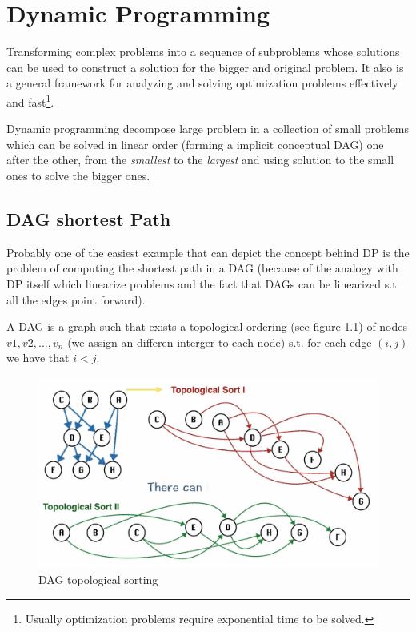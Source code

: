 \chapter{Dynamic Programming}
Transforming complex problems into a sequence of subproblems whose solutions can be used to construct a solution for the bigger and original problem.
It also is a general framework for analyzing and solving optimization problems effectively and fast\footnote{Usually optimization problems require exponential time to be solved.}.

Dynamic programming decompose large problem in a collection of small problems which can be solved in linear order (forming a implicit conceptual DAG) one after the other, from the \textit{smallest} to the \textit{largest} and using solution to the small ones to solve the bigger ones. 

\section{DAG shortest Path}
Probably one of the easiest example that can depict the concept behind DP is the problem of computing the shortest path in a DAG (because of the analogy with DP itself which linearize problems and the fact that DAGs can be linearized s.t. all the edges point forward).

\begin{framed}
A DAG is a graph such that exists a topological ordering (see figure \ref{fig:DAGsort}) of nodes $v1,v2, \ldots,v_n$ (we assign an differen interger to each  node) s.t. for each edge $(i,j)$ we have that $i<j$.
	
\end{framed}

	\begin{figure}
	\label{fig:DAGsort}
	\centering
	\includegraphics[width=\textwidth]{../images/DAGsort}
	\caption{DAG topological sorting}
	\end{figure}


